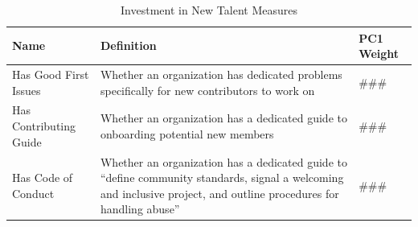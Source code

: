 \begin{longtable}{>{\raggedright\arraybackslash}p{} p{}p{}}
\caption{Investment in New Talent Measures}\label{tab:investment_in_new_talent_metrics}\\
\toprule
\textbf{Name} & \textbf{Definition}  & \textbf{PC1 Weight} \\
\midrule
\endfirsthead




\bottomrule
\endlastfoot
Has Good First Issues & Whether an organization has dedicated problems specifically for new contributors to work on & ###\\
Has Contributing Guide & Whether an organization has a dedicated guide to onboarding potential new members & ### \\
Has Code of Conduct & Whether an organization has a dedicated guide to ``define community standards, signal a welcoming and inclusive project, and outline procedures for handling abuse'' \citep{github_adding_2025} & ### \\
\end{longtable}

